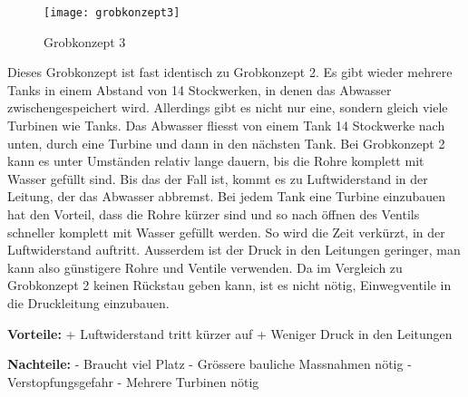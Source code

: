 \newpage
\begin{wrapfigure}{r}{0.5\textwidth}
  \begin{center}
    \texttt{[image: grobkonzept3]}
  \end{center}
  \caption{Grobkonzept 3}
\end{wrapfigure}
Dieses Grobkonzept ist fast identisch zu Grobkonzept 2. Es gibt wieder mehrere Tanks in einem Abstand von 14 Stockwerken, in denen das Abwasser zwischengespeichert wird. Allerdings gibt es nicht nur eine, sondern gleich viele Turbinen wie Tanks. Das Abwasser fliesst von einem Tank 14 Stockwerke nach unten, durch eine Turbine und dann in den nächsten Tank. Bei Grobkonzept 2 kann es unter Umständen relativ lange dauern, bis die Rohre komplett mit Wasser gefüllt sind. Bis das der Fall ist, kommt es zu Luftwiderstand in der Leitung, der das Abwasser abbremst. Bei jedem Tank eine Turbine einzubauen hat den Vorteil, dass die Rohre kürzer sind und so nach öffnen des Ventils schneller komplett mit Wasser gefüllt werden. So wird die Zeit verkürzt, in der Luftwiderstand auftritt. Ausserdem ist der Druck in den Leitungen geringer, man kann also günstigere Rohre und Ventile verwenden. Da im Vergleich zu Grobkonzept 2 keinen Rückstau geben kann, ist es nicht nötig, Einwegventile in die Druckleitung einzubauen. 

\textbf{Vorteile:} 									\newline
+	Luftwiderstand tritt kürzer auf 				\newline
+	Weniger Druck in den Leitungen					\newline

\textbf{Nachteile:}									\newline
-	Braucht viel Platz								\newline
-	Grössere bauliche Massnahmen nötig				\newline
-	Verstopfungsgefahr								\newline
-	Mehrere Turbinen nötig
\WFclear			
\newpage